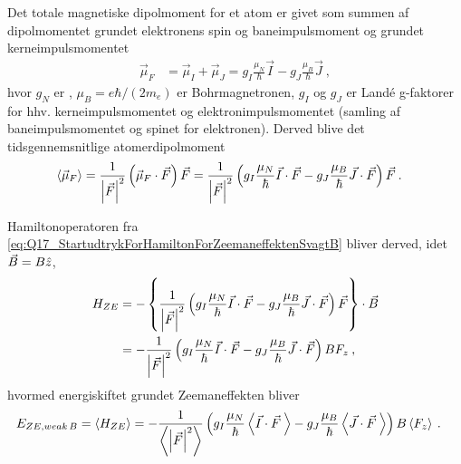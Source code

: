 Det totale magnetiske dipolmoment for et atom er givet som summen af dipolmomentet grundet elektronens spin og baneimpulsmoment og grundet kerneimpulsmomentet
\begin{align}
    \Vec{\mu}_F &= \Vec{\mu}_I + \Vec{\mu}_J = g_I \frac{\mu_N}{\hbar} \Vec{I} - g_J \frac{\mu_B}{\hbar} \Vec{J} \: ,
\end{align}
hvor $g_N$ er , $\mu_B = e\hbar/(2m_e)$ er Bohrmagnetronen, $g_I$ og $g_J$ er Landé g-faktorer for hhv. kerneimpulsmomentet og elektronimpulsmomentet (samling af baneimpulsmomentet og spinet for elektronen). Derved blive det tidsgennemsnitlige atomerdipolmoment
\begin{align}
    \Braket{\Vec{\mu}_F} &= \frac{1}{\abs{\Vec{F}}^2}\left(\Vec{\mu}_F \cdot \Vec{F} \right) \Vec{F}
    = \frac{1}{\abs{\Vec{F}}^2} \left(g_I \frac{\mu_N}{\hbar} \Vec{I} \cdot \Vec{F} - g_J \frac{\mu_B}{\hbar} \Vec{J} \cdot \Vec{F}\right) \Vec{F} \: .
\end{align}

Hamiltonoperatoren fra \cref{eq:Q17_StartudtrykForHamiltonForZeemaneffektenSvagtB} bliver derved, idet $\Vec{B} = B\Hat{z}$,
\begin{align}
    H_{ZE} &= -\left\{\frac{1}{\abs{\Vec{F}}^2} \left(g_I \frac{\mu_N}{\hbar} \Vec{I} \cdot \Vec{F} - g_J \frac{\mu_B}{\hbar} \Vec{J} \cdot \Vec{F}\right) \Vec{F}\right\} \cdot \Vec{B} \nonumber\\
    &= - \frac{1}{\abs{\Vec{F}}^2} \left(g_I \frac{\mu_N}{\hbar} \Vec{I} \cdot \Vec{F} - g_J \frac{\mu_B}{\hbar} \Vec{J} \cdot \Vec{F}\right) B F_z \: ,
\end{align}
hvormed energiskiftet grundet Zeemaneffekten bliver
\begin{align} \label{eq:Q17_StartudtrykForEnergiZeemaneffetenSvagtB}
    E_{ZE,weak\,B} &= \Braket{H_{ZE}} = - \frac{1}{\Braket{\abs{\Vec{F}}^2}} \left(g_I \frac{\mu_N}{\hbar} \Braket{\Vec{I} \cdot \Vec{F} \:} - g_J \frac{\mu_B}{\hbar} \Braket{\Vec{J} \cdot \Vec{F} \:}\right) B \Braket{F_z} \: .
\end{align}

